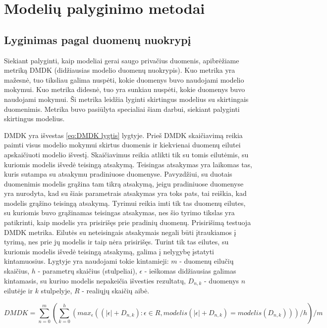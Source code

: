 \documentclass{VUMIFInfBakalaurinis}
\begin{document}
\section{Modelių palyginimo metodai}

\subsection{Lyginimas pagal duomenų nuokrypį}

\par Siekiant palyginti, kaip modeliai gerai saugo privačius duomenis, apibrėžiame metriką DMDK (didžiausias modelio duomenų nuokrypis). Kuo metrika yra mažesnė, tuo tiksliau galima nuspėti, kokie duomenys buvo naudojami modelio mokymui. Kuo metrika didesnė, tuo yra sunkiau nuspėti, kokie duomenys buvo naudojami mokymui. Ši metrika leidžia lyginti skirtingus modelius su skirtingais duomenimis. Metrika buvo pasiūlyta specialiai šiam darbui, siekiant palyginti skirtingus modelius.
\par DMDK yra išvestas \eqref{eq:DMDK lygtis} lygtyje. Prieš DMDK skaičiavimą reikia paimti visus modelio mokymui skirtus duomenis ir kiekvienai duomenų eilutei apskaičiuoti modelio išvestį. Skaičiavimus reikia atlikti tik su tomis eilutėmis, su kuriomis modelis išvedė teisingą atsakymą. Teisingas atsakymas yra laikomas tas, kuris sutampa su atsakymu pradiniuose duomenyse. Pavyzdžiui, su duotais duomenimis modelis grąžina tam tikrą atsakymą, jeigu pradiniuose duomenyse yra nurodyta, kad su šiais parametrais atsakymas yra toks pats, tai reiškia, kad modelis grąžino teisingą atsakymą. Tyrimui reikia imti tik tas duomenų eilutes, su kuriomis buvo grąžinamas teisingas atsakymas, nes šio tyrimo tikslas yra patikrinti, kaip modelis yra prisirišęs prie pradinių duomenų. Prisirišimą testuoja DMDK metrika. Eilutės su neteisingais atsakymais negali būti įtraukiamos į tyrimą, nes prie jų modelis ir taip nėra prisirišęs. Turint tik tas eilutes, su kuriomis modelis išvedė teisingą atsakymą, galima į nelygybę įstatyti kintamuosius. Lygtyje yra naudojami tokie kintamieji: $m$ - duomenų eilučių skaičius, $h$ - parametrų skaičius (stulpeliai), $\epsilon$ - ieškomas didžiausias galimas kintamasis, su kuriuo modelis nepakeičia išvesties rezultatų, $D_{n, k}$ - duomenys $n$ eilutėje ir $k$ stulpelyje, $R$ - realiųjų skaičių aibė.

\begin{equation}
DMDK = {\sum_{n=0}^{m} ({\sum_{k=0}^{h} (max_{\epsilon}((|\epsilon| + D_{n, k}) : \epsilon \in R, modelis(|\epsilon| + D_{n, k}) = modelis(D_{n, k})))}/{h})}/{m}
\label{eq:DMDK lygtis}
\end{equation} 
\end{document}
